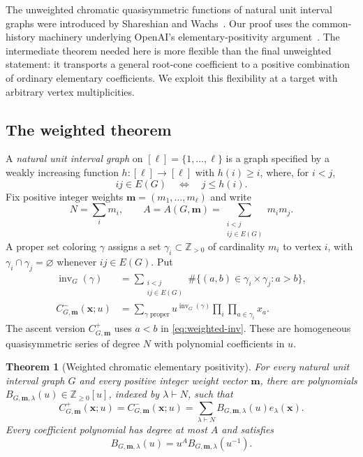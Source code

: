 \documentclass[11pt,reqno]{amsart}
\newcommand{\xx}{\mathbf x}
\newcommand{\mm}{\mathbf m}
\newcommand{\inv}{\operatorname{inv}}
\newtheorem{maintheorem}{Theorem}
\theoremstyle{definition}
\theoremstyle{remark}
\numberwithin{equation}{section}
\begin{document}
The unweighted chromatic quasisymmetric functions of natural unit
interval graphs were introduced by Shareshian and
Wachs~\cite{ShareshianWachs2016}.  Our proof uses the common-history
machinery underlying OpenAI's elementary-positivity
argument~\cite{OpenAI2026,OpenAILean2026}.  The intermediate theorem needed
here is more flexible than the final unweighted statement: it transports
a general root-cone coefficient to a positive combination of ordinary
elementary coefficients.  We exploit this flexibility at a target with
arbitrary vertex multiplicities.

\subsection{The weighted theorem}
A \emph{natural unit interval graph} on $[\ell]=\{1,\ldots,\ell\}$ is a
graph specified by a weakly increasing function
$h:[\ell]\to[\ell]$ with $h(i)\geq i$, where, for $i<j$,
\[
 ij\in E(G)\quad\Longleftrightarrow\quad j\leq h(i).
\]
Fix positive integer weights $\mm=(m_1,\ldots,m_\ell)$ and write
\begin{equation}\label{eq:NA}
 N=\sum_i m_i,\qquad
 A=A(G,\mm)=\sum_{\substack{i<j\\ij\in E(G)}}m_i m_j.
\end{equation}
A proper set coloring $\gamma$ assigns a set $\gamma_i\subset\mathbb Z_{>0}$
of cardinality $m_i$ to vertex $i$, with
$\gamma_i\cap\gamma_j=\varnothing$ whenever $ij\in E(G)$.  Put
\begin{align}
 \inv_G(\gamma)
 &=\sum_{\substack{i<j\\ij\in E(G)}}
   \#\{(a,b)\in\gamma_i\times\gamma_j:a>b\},\label{eq:weighted-inv}\\
 C^-_{G,\mm}(\xx;u)
 &=\sum_{\gamma\text{ proper}}u^{\inv_G(\gamma)}
       \prod_i\prod_{a\in\gamma_i}x_a.\label{eq:Cminus}
\end{align}
The ascent version $C^+_{G,\mm}$ uses $a<b$ in
\eqref{eq:weighted-inv}.  These are homogeneous quasisymmetric series of
degree $N$ with polynomial coefficients in $u$.

\begin{maintheorem}[Weighted chromatic elementary positivity]\label{thm:A}
For every natural unit interval graph $G$ and every positive integer
weight vector $\mm$, there are polynomials
$B_{G,\mm,\lambda}(u)\in\mathbb Z_{\geq0}[u]$, indexed by $\lambda\vdash N$,
such that
\begin{equation}\label{eq:thmA}
 C^+_{G,\mm}(\xx;u)=C^-_{G,\mm}(\xx;u)
   =\sum_{\lambda\vdash N}B_{G,\mm,\lambda}(u)e_\lambda(\xx).
\end{equation}
Every coefficient polynomial has degree at most $A$ and satisfies
\begin{equation}\label{eq:thmA-pal}
 B_{G,\mm,\lambda}(u)=u^A B_{G,\mm,\lambda}(u^{-1}).
\end{equation}
\end{maintheorem}
\end{document}
